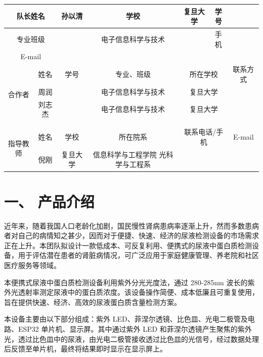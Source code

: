 \documentclass[a4paper,12pt]{article}
\begin{document}
\begin{table}[H]
    \centering
    \renewcommand{\arraystretch}{1.5}
    \begin{tabular}{|c|c|c|c|c|c|c|}
        \hline
        \multicolumn{2}{|c|}{队长姓名} & 孙以清 & 学校 & 复旦大学 & 学号 & \\
        \hline
        \multicolumn{2}{|c|}{专业班级} & \multicolumn{3}{c|}{电子信息科学与技术} & 手机 & \\
        \hline
        \multicolumn{2}{|c|}{E-mail} & \multicolumn{5}{c|}{} \\
        \hline
        \multirow{5}{*}{合作者} & 姓名 & 学号 & 专业、班级 & \multicolumn{2}{c|}{所在学校} & 联系方式 \\
        \cline{2-7}
        & 周润 & & 电子信息科学与技术 & \multicolumn{2}{c|}{复旦大学} & \\
        \cline{2-7}
        & 刘志杰 & & 电子信息科学与技术 & \multicolumn{2}{c|}{复旦大学} & \\
        \cline{2-7}
        & & & & \multicolumn{2}{c|}{} & \\
        \cline{2-7}
        & & & & \multicolumn{2}{c|}{} & \\
        \hline
        \multirow{2}{*}{指导教师} & 姓名 & 学校 & 所在院系 & \multicolumn{2}{c|}{联系电话/手机} & E-mail \\
        \cline{2-7}
        & 倪刚 & 复旦大学 & 信息科学与工程学院 光科学与工程系 & \multicolumn{2}{c|}{} & \\
        \hline
    \end{tabular}
\end{table}

\vspace{1cm}

\section*{一、 产品介绍}
近年来，随着我国人口老龄化加剧，国民慢性肾病患病率逐渐上升，然而多数患病者对自己的病情知之甚少，因而对于便捷、快速、经济的尿液检测设备的市场需求正在上升。本团队拟设计一款低成本、可反复利用、便携式的尿液中蛋白质检测设备，用于评估潜在患者的肾脏病情况，可广泛应用于家庭健康管理、养老院和社区医疗服务等领域。

本便携式尿液中蛋白质检测设备利用紫外分光光度法，通过 280-285nm 波长的紫外光透射率测定尿液中的蛋白质浓度。该设备操作简便、成本低廉且可重复使用，旨在提供快速、经济、高效的尿液蛋白质含量检测方案。

本设备主要由以下部分组成：紫外 LED、菲涅尔透镜、比色皿、光电二极管及电路、ESP32 单片机、显示屏。其中通过紫外 LED 和菲涅尔透镜产生聚焦的紫外光，透过比色皿中的尿液，由光电二极管接收透过比色皿的光信号，经过数据处理后反馈至单片机，最终将结果即时显示在显示屏上。
\end{document}
